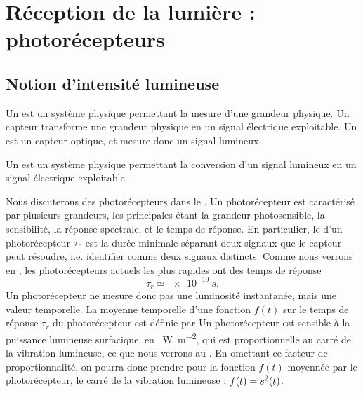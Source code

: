 \documentclass[12pt,fancy]{cours}
\begin{document}
\section{Réception de la lumière : photorécepteurs}
\subsection{Notion d’intensité lumineuse}

Un  est un système physique permettant la mesure d'une grandeur physique. Un capteur transforme une grandeur physique en un signal électrique exploitable. Un  est un capteur optique, et mesure donc un signal lumineux.
\begin{definition}[Photorécepteur]\label{def:}
  Un  est un système physique permettant la conversion d'un signal lumineux en un signal électrique exploitable.
\end{definition}
 Nous discuterons des photorécepteurs dans le . Un photorécepteur est caractérisé par plusieurs grandeurs, les principales étant la grandeur photosensible, la sensibilité, la réponse spectrale, et le temps de réponse.
En particulier, le  d'un photorécepteur $\tau_{\rm r}$ est  la durée minimale séparant deux signaux que le capteur peut résoudre, i.e. identifier comme deux signaux distincts. Comme nous verrons en , les  photorécepteurs actuels les plus rapides ont des temps de réponse 
\begin{equation}
  \tau_r \simeq \SI{e-10}{s}.
\end{equation}
Un photorécepteur ne mesure donc pas une luminosité instantanée, mais une valeur  temporelle.  La moyenne temporelle d’une fonction $f(t)$ sur le temps de réponse $\tau_r$ du photorécepteur est définie par
Un photorécepteur est sensible à la puissance lumineuse surfacique, en \SI{}{W.m^{-2}}, qui est proportionnelle au carré de la vibration lumineuse, ce que nous verrons au . En omettant ce facteur de proportionnalité, on pourra donc prendre pour la fonction $f(t)$ moyennée par le photorécepteur, le carré de la vibration lumineuse : $f(t) = s^2(t)$. 
\end{document}
